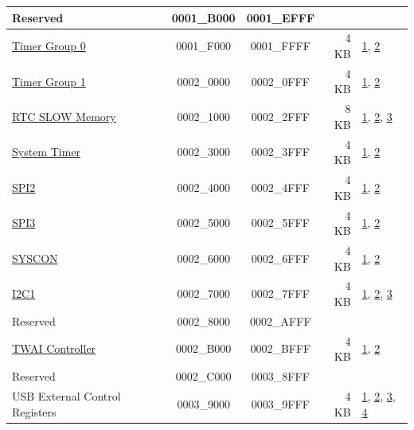 \begin{longtable}[c]{ |p{5.0cm}|c|c|r|p{1.5cm}| }
    \rowcolor{gray!25}
  Reserved   & \hexprefix{}0001\_B000 & \hexprefix{}0001\_EFFF &        &             \\\hline
               \hyperref[mod:timg]{Timer Group 0}     & \hexprefix{}0001\_F000 & \hexprefix{}0001\_FFFF &   4 KB &  \hyperref[PAM footnote: 1]{1}, \hyperref[PAM footnote: 2]{2}     \\\hline

              \hyperref[mod:timg]{Timer Group 1}     & \hexprefix{}0002\_0000 & \hexprefix{}0002\_0FFF &   4 KB &    \hyperref[PAM footnote: 1]{1}, \hyperref[PAM footnote: 2]{2}     \\\hline
              \hyperref[mod:lowpowm]{RTC SLOW Memory}     & \hexprefix{}0002\_1000 & \hexprefix{}0002\_2FFF &   8 KB &  \hyperref[PAM footnote: 1]{1}, \hyperref[PAM footnote: 2]{2}, \hyperref[PAM footnote: 3]{3}  \\\hline
               \hyperref[mod:systimer]{System Timer}    & \hexprefix{}0002\_3000 & \hexprefix{}0002\_3FFF &   4 KB &   \hyperref[PAM footnote: 1]{1}, \hyperref[PAM footnote: 2]{2}     \\\hline
               \hyperref[mod:spi]{SPI2}    & \hexprefix{}0002\_4000 & \hexprefix{}0002\_4FFF &   4 KB &         \hyperref[PAM footnote: 1]{1}, \hyperref[PAM footnote: 2]{2}     \\\hline
                \hyperref[mod:spi]{SPI3}   & \hexprefix{}0002\_5000 & \hexprefix{}0002\_5FFF &   4 KB &   \hyperref[PAM footnote: 1]{1}, \hyperref[PAM footnote: 2]{2}     \\\hline
                \hyperref[mod:permctrl]{SYSCON}   & \hexprefix{}0002\_6000 & \hexprefix{}0002\_6FFF &   4 KB &   \hyperref[PAM footnote: 1]{1}, \hyperref[PAM footnote: 2]{2}     \\\hline
                \hyperref[mod:i2c]{I2C1}   & \hexprefix{}0002\_7000 & \hexprefix{}0002\_7FFF &   4 KB &    \hyperref[PAM footnote: 1]{1}, \hyperref[PAM footnote: 2]{2}, \hyperref[PAM footnote: 3]{3}  \\\hline

    \rowcolor{gray!25}
  Reserved  & \hexprefix{}0002\_8000 & \hexprefix{}0002\_AFFF &        &                 \\\hline
              \hyperref[mod:twai]{TWAI Controller}      & \hexprefix{}0002\_B000 & \hexprefix{}0002\_BFFF &   4 KB &  \hyperref[PAM footnote: 1]{1}, \hyperref[PAM footnote: 2]{2}     \\\hline

    \rowcolor{gray!25}
   Reserved & \hexprefix{}0002\_C000 & \hexprefix{}0003\_8FFF &        &              \\\hline
               USB External Control Registers   & \hexprefix{}0003\_9000 & \hexprefix{}0003\_9FFF &   4 KB &       \hyperref[PAM footnote: 1]{1}, \hyperref[PAM footnote: 2]{2}, \hyperref[PAM footnote: 3]{3}, \hyperref[PAM footnote: 4]{4}     \\\hline


\end{longtable}
